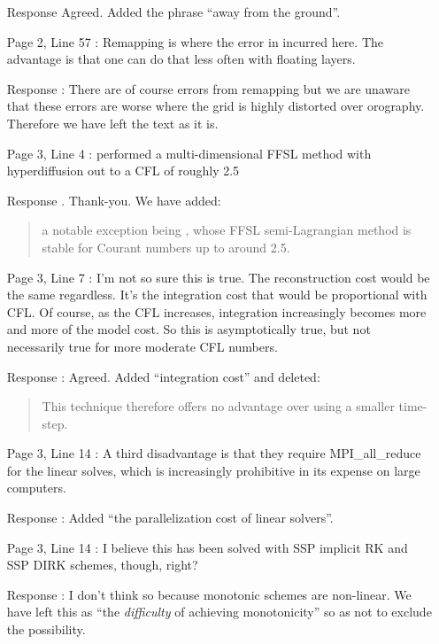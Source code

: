 \documentclass[12pt]{article}
\begin{document}
\begin{enumerate}
\item [Response] Agreed. Added the phrase ``away from the ground''.

\item [Page 2, Line 57]: Remapping is where the error in incurred here. The advantage is that one can do that less often with floating layers.

\item [Response]: There are of course errors from remapping but we are unaware that these errors are worse where the grid is highly distorted over orography. Therefore we have left the text as it is.

\item [Page 3, Line 4]: \cite{UN14} performed a multi-dimensional FFSL method with hyperdiffusion out to a CFL of roughly 2.5

\item [Response]. Thank-you. We have added:
\begin{quote}
a notable exception being \cite{UN14}, whose FFSL semi-Lagrangian method is stable for Courant numbers up to around 2.5.
\end{quote}

\item [Page 3, Line 7]: I'm not so sure this is true. The reconstruction cost would be the same regardless. It's the integration cost that would be proportional with CFL. Of course, as the CFL increases, integration increasingly becomes more and more of the model cost. So this is asymptotically true, but not necessarily true for more moderate CFL numbers.

\item [Response]: Agreed. Added ``integration cost'' and deleted:
\begin{quote}
This technique therefore offers no advantage over using a smaller time-step.
\end{quote}

\item [Page 3, Line 14]: A third disadvantage is that they require MPI\_all\_reduce for the linear solves, which is increasingly prohibitive in its expense on large computers.

\item [Response]: Added ``the parallelization cost of linear solvers''.

\item [Page 3, Line 14]: I believe this has been solved with SSP implicit RK and SSP DIRK schemes, though, right?

\item [Response]: I don't think so because monotonic schemes are non-linear. We have left this as ``the \emph{difficulty} of achieving monotonicity'' so as not to exclude the possibility. 


\end{enumerate}
\end{document}
